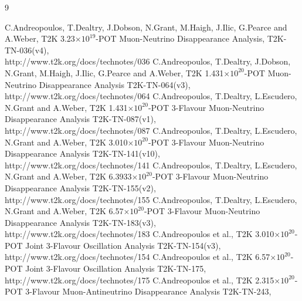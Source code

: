 %
%

\begin{thebibliography}{9}

%
%
   C.Andreopoulos, T.Dealtry, J.Dobson, N.Grant, M.Haigh, J.Ilic, G.Pearce and A.Weber,
   T2K 3.23$\times10^{19}$-POT Muon-Neutrino Disappearance Analysis,
   T2K-TN-036(v4),\\
   http://www.t2k.org/docs/technotes/036
   C.Andreopoulos, T.Dealtry, J.Dobson, N.Grant, M.Haigh, J.Ilic, G.Pearce and A.Weber,
   T2K 1.431$\times10^{20}$-POT Muon-Neutrino Disappearance Analysis
   T2K-TN-064(v3),\\
   http://www.t2k.org/docs/technotes/064
   C.Andreopoulos, T.Dealtry, L.Escudero, N.Grant and A.Weber,
   T2K 1.431$\times10^{20}$-POT 3-Flavour Muon-Neutrino Disappearance Analysis
   T2K-TN-087(v1),\\
   http://www.t2k.org/docs/technotes/087
   C.Andreopoulos, T.Dealtry, L.Escudero, N.Grant and A.Weber,
   T2K 3.010$\times10^{20}$-POT 3-Flavour Muon-Neutrino Disappearance Analysis
   T2K-TN-141(v10),\\
   http://www.t2k.org/docs/technotes/141
   C.Andreopoulos, T.Dealtry, L.Escudero, N.Grant and A.Weber,
   T2K 6.3933$\times10^{20}$-POT 3-Flavour Muon-Neutrino Disappearance Analysis
   T2K-TN-155(v2),\\
   http://www.t2k.org/docs/technotes/155
   C.Andreopoulos, T.Dealtry, L.Escudero, N.Grant and A.Weber,
   T2K 6.57$\times10^{20}$-POT 3-Flavour Muon-Neutrino Disappearance Analysis
   T2K-TN-183(v3),\\
   http://www.t2k.org/docs/technotes/183
   C.Andreopoulos et al.,
   T2K 3.010$\times10^{20}$-POT Joint 3-Flavour Oscillation Analysis
   T2K-TN-154(v3),\\
   http://www.t2k.org/docs/technotes/154
   C.Andreopoulos et al.,
   T2K 6.57$\times10^{20}$-POT Joint 3-Flavour Oscillation Analysis
   T2K-TN-175,\\
   http://www.t2k.org/docs/technotes/175
   C.Andreopoulos et al.,
   T2K 2.315$\times10^{20}$-POT 3-Flavour Muon-Antineutrino Disappearance Analysis
   T2K-TN-243,\\

\end{thebibliography}
